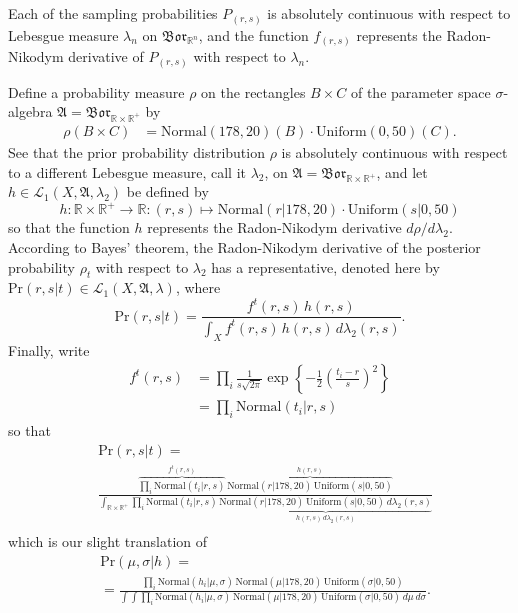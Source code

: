 \documentclass[
twoside=true,
paper=letter,
fontsize=11pt,
pagesize=auto,
leqno,
openany,
headsepline,
overfullrule,
]{scrbook}
\theoremstyle{plain}
\theoremstyle{plain}
\theoremstyle{definition}
\theoremstyle{bfnoteitalic}
\theoremstyle{bfnoteroman}
\newcommand{\sigalg}[1]{\mathfrak{#1}}
\newcommand{\cali}[1]{\mathscr{#1}}
\newcommand{\borel}{\mathfrak{Bor}}
\newcommand{\textsigma}{\hbox{\large{$\sigma$}}\kern-1pt}
\newcommand{\R}{\mathbb{R}}
\newcommand{\function}{f}
\newcommand{\functioniii}{h}
\newcommand{\measurespace}{X}
\newcommand{\measureiii}{\lambda}
\newcommand{\setii}{B}
\newcommand{\setiii}{C}
\newcommand{\pspace}{\measurespace}%
\newcommand{\pspacesig}{\sigalg{A}}
\begin{document}
Each of the sampling probabilities $P_{(r,s)}$ is absolutely continuous with respect to Lebesgue measure
$\measureiii_n$ on $\borel_{\R^n}$, and
the function $\function_{(r,s)}$ represents the Radon-Nikodym derivative of 
$P_{(r,s)}$ with respect to $\measureiii_n$.

Define a probability measure $\rho$ on the rectangles $\setii\times\setiii$ of the parameter space \textsigma-algebra 
$\pspacesig=\borel_{\R\times\R^+}$ by
\begin{align*}
\rho(\setii\times\setiii)
&=\text{Normal}(178,20)(\setii)\cdot\text{Uniform}(0,50)(\setiii).
\end{align*}
See that the prior probability distribution $\rho$ is absolutely continuous with respect to a different Lebesgue measure, call it
$\lambda_2$, on $\pspacesig=\borel_{\R\times\R^+}$,
and let $\functioniii\in\cali{L}_1(\pspace,\pspacesig,\lambda_2)$ be defined by
\[
\functioniii:\R\times\R^+\to\R:(r,s)\mapsto
\text{Normal}(r\vert 178,20)\cdot
\text{Uniform}(s\vert 0,50)
\]
so that the function $\functioniii$ represents the Radon-Nikodym derivative $d\rho/d\lambda_2$.
According to Bayes' theorem, the Radon-Nikodym derivative of the posterior probability 
$\rho_t$ with respect to $\lambda_2$ has a representative, denoted here by 
$\text{Pr}(r,s\vert t)\in\cali{L}_1(\pspace, \pspacesig,\lambda)$,
where 
\[
\text{Pr}(r,s\vert t)
=
\frac{\function^t(r,s)\,\functioniii(r,s)}
{\int_{\pspace}\function^t(r,s)\,\functioniii(r,s)\,d\lambda_2(r,s)}.
\]
Finally, write 
\begin{align*}
\function^t (r,s)
& =
\prod_i
\frac{1}{s\sqrt{2\pi}}
\exp
\left\{
-\frac{1}{2}
\left(
\frac{t_i-r}{s}
\right)^2
\right\} \\
& = \prod_i\text{Normal}(t_i\vert r,s) 
\end{align*}
so that
\begin{align*}
& \text{Pr}(r,s\vert t) =
\\
&
\frac{
\overbrace{\textstyle{\prod_i}\text{Normal}(t_i\vert r,s)}^{\function^t(r,s)}\,
\overbrace{\text{Normal}(r\vert 178,20)\,
\text{Uniform}(s\vert 0,50)}^{\functioniii(r,s)}
}
{
\int_{\R\times\R^+}
\prod_i\text{Normal}(t_i\vert r,s)\,
\underbrace{\text{Normal}(r\vert 178,20)\,
\text{Uniform}(s\vert 0,50)\,
d\lambda_2(r,s)}_{\functioniii(r,s)\,d\lambda_2(r,s)}
}
\\
\end{align*}
which is our slight translation of 
\begin{align*}
& \text{Pr}(\mu,\sigma\vert h) =
\\
& =
\frac{
\prod_i
\text{Normal}(h_i\vert \mu,\sigma)
\,\text{Normal}(\mu\vert 178,20)
\,\text{Uniform}(\sigma\vert 0,50)
}
{
\int\int
\prod_i
\text{Normal}(h_i\vert \mu,\sigma)
\,\text{Normal}(\mu\vert 178,20)
\,\text{Uniform}(\sigma\vert 0,50)
\,d\mu\, d\sigma
}.
\\
\end{align*}
\end{document}
